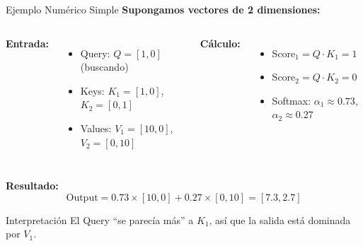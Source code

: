 \documentclass[aspectratio=169]{beamer}
\begin{document}
\begin{frame}{Ejemplo Numérico Simple}
    \textbf{Supongamos vectores de 2 dimensiones:}
    
    \vspace{0.3cm}
    \begin{columns}
        \textbf{Entrada:}
        \begin{itemize}
            \item Query: $Q = [1, 0]$ (buscando)
            \item Keys: $K_1 = [1, 0]$, $K_2 = [0, 1]$
            \item Values: $V_1 = [10, 0]$, $V_2 = [0, 10]$
        \end{itemize}
        
        \textbf{Cálculo:}
        \begin{itemize}
            \item Score$_1 = Q \cdot K_1 = 1$
            \item Score$_2 = Q \cdot K_2 = 0$
            \item Softmax: $\alpha_1 \approx 0.73$, $\alpha_2 \approx 0.27$
        \end{itemize}
    \end{columns}
    
    \vspace{0.3cm}
    \textbf{Resultado:}
    \[
    \text{Output} = 0.73 \times [10, 0] + 0.27 \times [0, 10] = [7.3, 2.7]
    \]
    
    \vspace{0.2cm}
    \begin{block}{Interpretación}
        El Query ``se parecía más'' a $K_1$, así que la salida está dominada por $V_1$.
    \end{block}
\end{frame}
\end{document}
